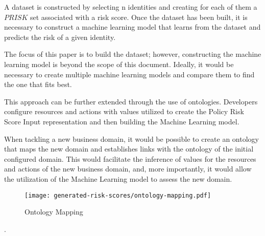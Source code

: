 \vspace{15pt}

A dataset is constructed by selecting n identities and creating for each of them a $PRISK$ set associated with a risk score. 
Once the dataset has been built, it is necessary to construct a machine learning model that learns from the dataset and predicts the risk of a given identity.

\vspace{15pt}

The focus of this paper is to build the dataset; however, constructing the machine learning model is beyond the scope of this document. Ideally, it would be necessary to create multiple machine learning models and compare them to find the one that fits best.

\vspace{15pt}

This approach can be further extended through the use of ontologies. Developers configure resources and actions with values utilized to create the Policy Risk Score Input representation and then building the Machine Learning model.

When tackling a new business domain, it would be possible to create an ontology that maps the new domain and establishes links with the ontology of the initial configured domain. 
This would facilitate the inference of values for the resources and actions of the new business domain, and, more importantly, it would allow the utilization of the Machine Learning model to assess the new domain.

\begin{figure}[h]
    \centering
    \texttt{[image: generated-risk-scores/ontology-mapping.pdf]}
    \caption{Ontology Mapping}
    \label{fig:ontology-mapping}
\end{figure}.